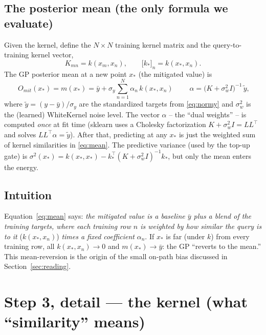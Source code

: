 \documentclass[11pt]{article}
\def\bm#1{#1}%
\def\texttt#1{#1}%
\def\mathrm#1{#1}%
\begin{document}
\subsection{The posterior mean (the only formula we evaluate)}
Given the kernel, define the $N\times N$ training kernel matrix and the
query-to-training kernel vector,
\begin{equation}
K_{mn}=k(\bm x_m,\bm x_n),\qquad
\big[\bm k_*\big]_n=k(\bm x_*,\bm x_n).
\end{equation}
The GP posterior mean at a new point $\bm x_*$ (the mitigated value) is
\begin{equation}
\boxed{\;O_{\mathrm{mit}}(\bm x_*)=m(\bm x_*)
=\bar y+\sigma_y\sum_{n=1}^{N}\alpha_n\,k(\bm x_*,\bm x_n)\;}
\qquad
\bm\alpha=\big(K+\sigma_w^2 I\big)^{-1}\,\tilde{\bm y},
\label{eq:mean}
\end{equation}
where $\tilde{\bm y}=(\bm y-\bar y)/\sigma_y$ are the standardized targets from
\eqref{eq:normy} and $\sigma_w^2$ is the (learned) \texttt{WhiteKernel} noise
level. The vector $\bm\alpha$ -- the ``dual weights'' -- is computed \emph{once}
at fit time (sklearn uses a Cholesky factorization $K+\sigma_w^2 I=LL^{\!\top}$
and solves $L L^{\!\top}\bm\alpha=\tilde{\bm y}$). After that, predicting at any
$\bm x_*$ is just the weighted sum of kernel similarities in \eqref{eq:mean}. The
predictive variance (used by the top-up gate) is
$\sigma^2(\bm x_*)=k(\bm x_*,\bm x_*)-\bm k_*^{\!\top}(K+\sigma_w^2 I)^{-1}\bm
k_*$, but only the mean enters the energy.

\subsection{Intuition}
Equation~\eqref{eq:mean} says: \emph{the mitigated value is a baseline $\bar y$
plus a blend of the training targets, where each training row $n$ is weighted by
how similar the query is to it} ($k(\bm x_*,\bm x_n)$) \emph{times a fixed
coefficient} $\alpha_n$. If $\bm x_*$ is far (under $k$) from every training row,
all $k(\bm x_*,\bm x_n)\to0$ and $m(\bm x_*)\to\bar y$: the GP ``reverts to the
mean.'' This mean-reversion is the origin of the small on-path bias discussed in
Section~\ref{sec:reading}.

\section{Step 3, detail --- the kernel (what ``similarity'' means)}
\label{sec:kernel}
\end{document}
